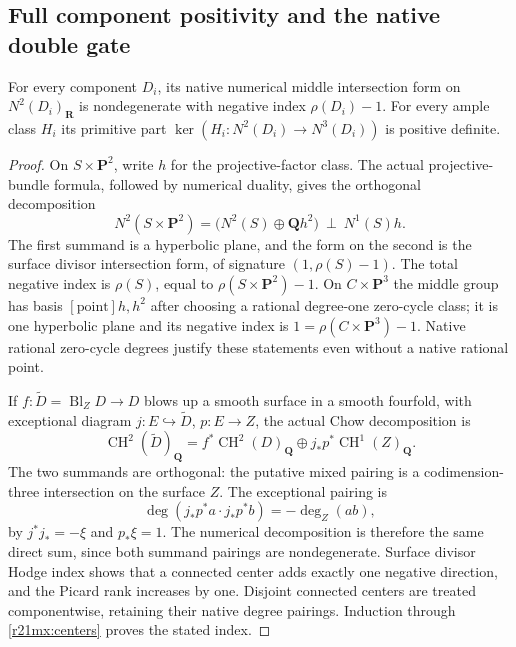 \subsection{Full component positivity and the native double gate}

\begin{lemma}
\label{r21mx:positive}
For every component $D_i$, its native numerical middle intersection
form on $N^2(D_i)_{\mathbf R}$ is nondegenerate with negative index
$\rho(D_i)-1$.  For every ample class $H_i$ its primitive part
$\ker(H_i:N^2(D_i)\to N^3(D_i))$ is positive definite.
\end{lemma}

\begin{proof}
On $S\times\mathbf P^2$, write $h$ for the projective-factor class.
The actual projective-bundle formula, followed by numerical duality,
gives the orthogonal decomposition
\[
 N^2(S\times\mathbf P^2)
    =\bigl(N^2(S)\oplus\mathbf Qh^2\bigr)\ \perp\ N^1(S)h.
 \tag{MX21.7}\label{r21mx:product-form}
\]
The first summand is a hyperbolic plane, and the form on the second
is the surface divisor intersection form, of signature
$(1,\rho(S)-1)$.  The total negative index is $\rho(S)$, equal to
$\rho(S\times\mathbf P^2)-1$.  On $C\times\mathbf P^3$ the middle
group has basis $[\mathrm{point}]h,h^2$ after choosing a rational
degree-one zero-cycle class; it is one hyperbolic plane and its
negative index is $1=\rho(C\times\mathbf P^3)-1$.
Native rational zero-cycle degrees justify these statements even
without a native rational point.

If $f:\widetilde D=\operatorname{Bl}_ZD\to D$ blows up a smooth
surface in a smooth fourfold, with exceptional diagram
$j:E\hookrightarrow\widetilde D$, $p:E\to Z$, the actual Chow
decomposition is
\[
 \operatorname{CH}^2(\widetilde D)_{\mathbf Q}
    =f^*\operatorname{CH}^2(D)_{\mathbf Q}
       \oplus j_*p^*\operatorname{CH}^1(Z)_{\mathbf Q}.
 \tag{MX21.8}\label{r21mx:blowup}
\]
The two summands are orthogonal: the putative mixed pairing is a
codimension-three intersection on the surface $Z$.  The exceptional
pairing is
\[
     \deg(j_*p^*a\cdot j_*p^*b)=-\deg_Z(ab),
 \tag{MX21.9}\label{r21mx:exceptional}
\]
by $j^*j_*=-\xi$ and $p_*\xi=1$.
The numerical decomposition is therefore the same direct sum, since
both summand pairings are nondegenerate.  Surface divisor Hodge index
shows that a connected center adds exactly one negative direction,
and the Picard rank increases by one.  Disjoint connected centers
are treated componentwise, retaining their native degree pairings.
Induction through \eqref{r21mx:centers} proves the stated index.


\end{proof}
